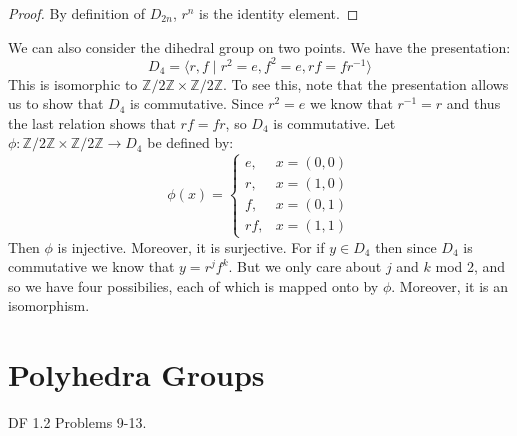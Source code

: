     \begin{proof}
        By definition of $D_{2n}$, $r^{n}$ is the identity element.
    \end{proof}
    \begin{example}
        We can also consider the dihedral group on two points. We have
        the presentation:
        \begin{equation}
            D_{4}=\langle{r,f}\;|\;
                r^{2}=e,f^{2}=e,rf=fr^{\minus{1}}\rangle
        \end{equation}
        This is isomorphic to
        $\mathbb{Z}/2\mathbb{Z}\times\mathbb{Z}/2\mathbb{Z}$. To see
        this, note that the presentation allows us to show that $D_{4}$
        is commutative. Since $r^{2}=e$ we know that $r^{\minus{1}}=r$
        and thus the last relation shows that $rf=fr$, so $D_{4}$ is
        commutative. Let
        $\phi:\mathbb{Z}/2\mathbb{Z}\times\mathbb{Z}/2\mathbb{Z}%
         \rightarrow{D}_{4}$ be defined by:
        \begin{equation}
            \phi(x)=
            \begin{cases}
                e,&x=(0,0)\\
                r,&x=(1,0)\\
                f,&x=(0,1)\\
                rf,&x=(1,1)
            \end{cases}
        \end{equation}
        Then $\phi$ is injective. Moreover, it is surjective. For if
        $y\in{D}_{4}$ then since $D_{4}$ is commutative we know that
        $y=r^{j}f^{k}$. But we only care about $j$ and $k$ mod 2, and
        so we have four possibilies, each of which is mapped onto by
        $\phi$. Moreover, it is an isomorphism.
    \end{example}
\section{Polyhedra Groups}
    DF 1.2 Problems 9-13.
